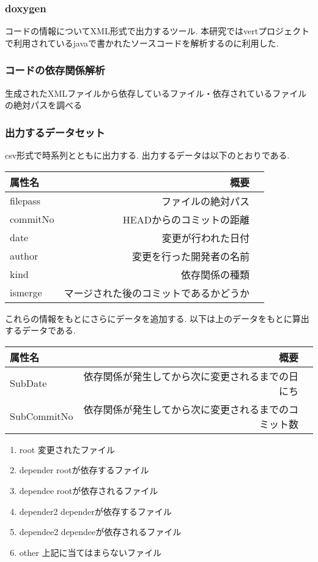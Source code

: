 \documentclass{jsarticle}
\begin{document}
\subsubsection{doxygen}
コードの情報についてXML形式で出力するツール.
本研究ではvertプロジェクトで利用されているjavaで書かれたソースコードを解析するのに利用した.

\subsubsection{コードの依存関係解析}
生成されたXMLファイルから依存しているファイル・依存されているファイルの絶対パスを調べる


\subsubsection{出力するデータセット}
csv形式で時系列とともに出力する.
出力するデータは以下のとおりである.

\begin{tabular}{|l|r|r|} \hline
属性名 & 概要 \\ \hline
filepass & ファイルの絶対パス \\ \hline
commitNo & HEADからのコミットの距離 \\ \hline
date & 変更が行われた日付 \\ \hline
author & 変更を行った開発者の名前 \\ \hline
kind & 依存関係の種類 \\ \hline
ismerge & マージされた後のコミットであるかどうか \\ \hline
\end{tabular}

これらの情報をもとにさらにデータを追加する.
以下は上のデータをもとに算出するデータである.
\begin{tabular}{|l|r|r|} \hline
属性名 & 概要 \\ \hline
SubDate & 依存関係が発生してから次に変更されるまでの日にち \\ \hline
SubCommitNo & 依存関係が発生してから次に変更されるまでのコミット数 \\ \hline
\end{tabular}

\begin{enumerate}
\item root 変更されたファイル
\item depender rootが依存するファイル
\item dependee rootが依存されるファイル
\item depender2 dependerが依存するファイル
\item dependee2 dependeeが依存されるファイル
\item other 上記に当てはまらないファイル
\end{enumerate}
\end{document}
